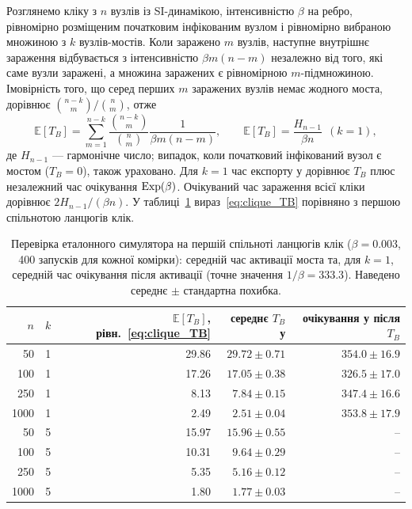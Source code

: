 Розглянемо кліку з $n$ вузлів із SI-динамікою, інтенсивністю $\beta$ на ребро, рівномірно розміщеним початковим інфікованим вузлом і рівномірно вибраною множиною з $k$ вузлів-мостів. Коли заражено $m$ вузлів, наступне внутрішнє зараження відбувається з інтенсивністю $\beta m(n-m)$ незалежно від того, які саме вузли заражені, а множина заражених є рівномірною $m$-підмножиною. Імовірність того, що серед перших $m$ заражених вузлів немає жодного моста, дорівнює $\binom{n-k}{m}/\binom{n}{m}$, отже
\begin{equation}
\label{eq:clique_TB}
\mathbb{E}[T_B]=\sum_{m=1}^{n-k}\frac{\binom{n-k}{m}}{\binom{n}{m}}\frac{1}{\beta m(n-m)},
\qquad
\mathbb{E}[T_B]=\frac{H_{n-1}}{\beta n}\ \ (k=1),
\end{equation}
де $H_{n-1}$ --- гармонічне число; випадок, коли початковий інфікований вузол є мостом ($T_B=0$), також ураховано. Для $k=1$ час експорту у \Full{} дорівнює $T_B$ плюс незалежний час очікування $\mathrm{Exp}(\beta)$. Очікуваний час зараження всієї кліки дорівнює $2H_{n-1}/(\beta n)$. У таблиці~\ref{tab:verification} вираз~\eqref{eq:clique_TB} порівняно з першою спільнотою ланцюгів клік.

\clearpage
\begin{table}[H]
\centering
\caption{Перевірка еталонного симулятора на першій спільноті ланцюгів клік ($\beta=0.003$, 400 запусків для кожної комірки): середній час активації моста та, для $k=1$, середній час очікування після активації (точне значення $1/\beta=333.3$). Наведено середнє $\pm$ стандартна похибка.}
\label{tab:verification}
\small
\begin{tabular}{rrrrr}
\toprule
$n$ & $k$ & $\mathbb{E}[T_B]$, рівн.~\eqref{eq:clique_TB} & середнє $T_B$ у \Full{} & очікування у \Full{} після $T_B$\\
\midrule
50 & 1 & 29.86 & $29.72\pm0.71$ & $354.0\pm16.9$\\
100 & 1 & 17.26 & $17.05\pm0.38$ & $326.5\pm17.0$\\
250 & 1 & 8.13 & $7.84\pm0.15$ & $347.4\pm16.6$\\
1000 & 1 & 2.49 & $2.51\pm0.04$ & $353.8\pm17.9$\\
50 & 5 & 15.97 & $15.96\pm0.55$ & --\\
100 & 5 & 10.31 & $9.64\pm0.29$ & --\\
250 & 5 & 5.35 & $5.16\pm0.12$ & --\\
1000 & 5 & 1.80 & $1.77\pm0.03$ & --\\
\bottomrule
\end{tabular}
\end{table}

